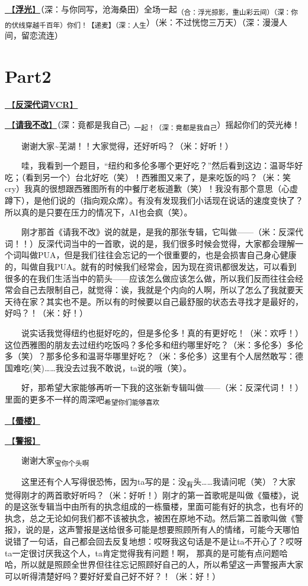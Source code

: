 \documentclass[]{ctexbook}
\begin{document}
\hyperref[floating-light]{🎵【\textbf{浮光}】}（深：与你同写，沧海桑田）全场一起\textsubscript{（合：浮光掠影，重山彩云间）（深：你的伏线穿越千百年）你们！【递麦】（深：人生}）（米：不过恍惚三万天）（深：漫漫人间，留恋流连）

\section{Part2}\label{Toronto-20250315-part2}

\hyperref[senself-vcr]{🎥【\textbf{反深代词VCR}】}

\hyperref[brave-heart]{🎵【\textbf{请我不改}】}（深：竟都是我自己\textsubscript{）一起！（深：竟都是我自己}）摇起你们的荧光棒！

  谢谢大家\textasciitilde 芜湖！！大家觉得，还好听吗？（米：好听！）

  哇，我看到一个题目，``纽约和多伦多哪个更好吃？''然后看到这边：温哥华好吃；（看到另一个）台北好吃（笑）！西雅图又来了，是来吃饭的吗？（米：笑cry）我真的很想跟西雅图所有的中餐厅老板道歉（笑）！我没有那个意思（心虚蹲下），是他们说的（指向观众席）。有没有发现我们小话现在说话的速度变快了？所以真的是只要在压力的情况下，AI也会疯（笑）。

  刚才那首《请我不改》说的就是，是我的那张专辑，它叫做------（米：反深代词！！）反深代词当中的一首歌，说的是，我们很多时候会觉得，大家都会理解一个词叫做PUA，但是我们往往会忘记的一个很重要的，也是会损害自己身心健康的，叫做自我PUA。就有的时候我们经常会，因为现在资讯都很发达，可以看到很多的在我们生活当中的箭头------应该怎么做应该怎么做，所以我们反而往往会经常会自己去限制自己，就觉得：诶，我就是个内向的人啊，所以了怎么了我就要天天待在家？其实也不是。所以有的时候要以自己最舒服的状态去寻找才是最好的，好吗？！（米：好！）

  说实话我觉得纽约也挺好吃的，但是多伦多！真的有更好吃！（米：欢呼！）这位西雅图的朋友去过纽约吃饭吗？多伦多和纽约哪里好吃？（米：多伦多）多伦多（笑）？那多伦多和温哥华哪里好吃？（米：多伦多）这里有个人居然敢写：德国难吃(笑)\ldots\ldots 我没去过我不敢说，ta说的哦（笑）。

  好，那希望大家能够再听一下我的这张新专辑叫做------（米：反深代词！！）里面的更多不一样的周深吧\textsubscript{希望你们能够喜欢}

\hyperref[mirage]{🎵【\textbf{蜃楼}】}

\hyperref[the-giver]{🎵【\textbf{警报}】}

  谢谢大家\textsubscript{宝你个头啊}

  这里还有个人写得很恐怖，因为ta写的是：没\textsubscript{有}头\ldots\ldots 我请问呢（笑）？大家觉得刚才的两首歌好听吗？（米：好听！）刚才的第一首歌呢是叫做《蜃楼》，说的是这张专辑当中由所有的执念组成的一栋蜃楼，里面可能有好的执念，也有坏的执念，总之无论如何我们都不该被执念，被困在原地不动。然后第二首歌叫做《警报》，说的是，这声警报是送给很多可能是想要照顾所有人的情绪，可能今天哪怕说错了一句话，自己都会回去反复地想：哎呀我这句话是不是让ta不开心了？哎呀ta一定很讨厌我这个人，ta肯定觉得我有问题！啊， 那真的是可能有点问题哈哈，所以就是照顾全世界但往往忘记照顾好自己的人，所以希望这一声警报声大家可以听得清楚好吗？要好好爱自己好不好？！（米：好！）
\end{document}
